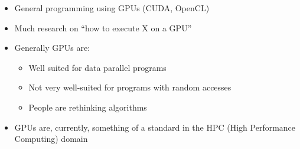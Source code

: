 \documentclass[a4paper]{article}
\begin{document}
\begin{itemize}
\begin{itemize}
\item General programming using GPUs (CUDA, OpenCL)
\item Much research on ``how to execute X on a GPU''
\item Generally GPUs are:
\begin{itemize}
\item Well suited for data parallel programs
\item Not very well-suited for programs with random accesses
\item People are rethinking algorithms
\end{itemize}
\item GPUs are, currently, something of a standard in the HPC (High Performance Computing) domain
\end{itemize}
\end{itemize}
\end{document}

